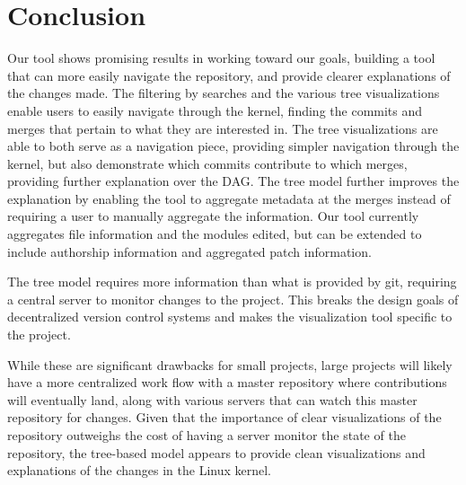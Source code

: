 \documentclass[conference, draftclsnofoot, draft]{IEEEtran}
\begin{document}
\section{Conclusion}

Our tool shows promising results in working toward our goals, building a tool that
can more easily navigate the repository, and provide clearer explanations of the
changes made. The filtering by searches and the various tree visualizations enable
users to easily navigate through the kernel, finding the commits and merges that
pertain to what they are interested in. The tree visualizations are able to both
serve as a navigation piece, providing simpler navigation through the kernel, but
also demonstrate which commits contribute to which merges, providing further
explanation over the DAG. The tree model further improves the explanation by enabling
the tool to aggregate metadata at the merges instead of requiring a user to manually
aggregate the information. Our tool currently aggregates file information and the
modules edited, but can be extended to include authorship information and aggregated
patch information.

The tree model requires more information than what is provided by git, requiring a
central server to monitor changes to the project. This breaks the design goals of
decentralized version control systems and makes the visualization tool specific to
the project.

While these are significant drawbacks for small projects, large projects will likely
have a more centralized work flow with a master repository where contributions will
eventually land, along with various servers that can watch this master repository
for changes. Given that the importance of clear visualizations of the repository
outweighs the cost of having a server monitor the state of the repository, the
tree-based model appears to provide clean visualizations and explanations of the
changes in the Linux kernel.




\end{document}

